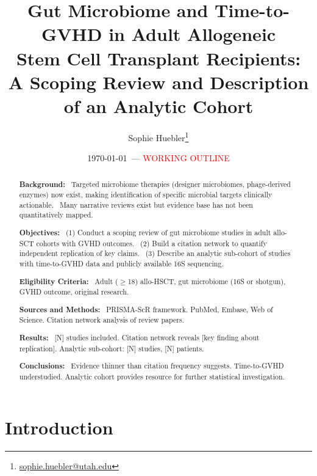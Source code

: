 \documentclass[11pt,a4paper]{article}
\newcommand{\todoitem}[1]{\textcolor{blue!70!black}{\textbullet~#1}}
\begin{document}
\title{Gut Microbiome and Time-to-GVHD in Adult Allogeneic\\
Stem Cell Transplant Recipients:\\
A Scoping Review and Description of an Analytic Cohort}
\author{Sophie Huebler\thanks{\href{mailto:sophie.huebler@utah.edu}{sophie.huebler@utah.edu}}}
\date{\today~--- \textcolor{red}{WORKING OUTLINE}}
\maketitle

\renewcommand\abstractname{Abstract}
\begin{abstract}
\noindent\textbf{Background:}
\todoitem{Targeted microbiome therapies (designer microbiomes, phage-derived enzymes) now exist, making identification of specific microbial targets clinically actionable.}
\todoitem{Many narrative reviews exist but evidence base has not been quantitatively mapped.}

\noindent\textbf{Objectives:}
\todoitem{(1) Conduct a scoping review of gut microbiome studies in adult allo-SCT cohorts with GVHD outcomes.}
\todoitem{(2) Build a citation network to quantify independent replication of key claims.}
\todoitem{(3) Describe an analytic sub-cohort of studies with time-to-GVHD data and publicly available 16S sequencing.}

\noindent\textbf{Eligibility Criteria:}
\todoitem{Adult ($\geq$18) allo-HSCT, gut microbiome (16S or shotgun), GVHD outcome, original research.}

\noindent\textbf{Sources and Methods:}
\todoitem{PRISMA-ScR framework. PubMed, Embase, Web of Science. Citation network analysis of review papers.}

\noindent\textbf{Results:}
\todoitem{[N] studies included. Citation network reveals [key finding about replication]. Analytic sub-cohort: [N] studies, [N] patients.}

\noindent\textbf{Conclusions:}
\todoitem{Evidence thinner than citation frequency suggests. Time-to-GVHD understudied. Analytic cohort provides resource for further statistical investigation.}
\end{abstract}

\tableofcontents
\newpage


\section{Introduction}
\label{sec:introduction}
\end{document}
